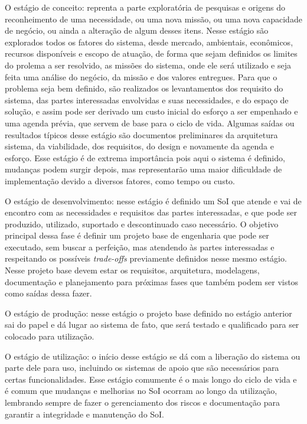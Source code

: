 	O estágio de conceito: reprenta a parte exploratória de pesquisas e origens do reconheimento de uma necessidade, ou uma nova missão, ou uma nova capacidade de negócio, ou
	ainda a alteração de algum desses itens. Nesse estágio são explorados todos os fatores do sistema, desde mercado, ambientais, econômicos, recursos disponíveis e escopo de
	atuação, de forma que sejam definidos os limites do prolema a ser resolvido, as missões do sistema, onde ele será utilizado e seja feita uma análise do negócio, da missão e
	dos valores entregues. Para que o problema seja bem definido, são realizados os levantamentos dos requisito do sistema, das partes interessadas envolvidas e suas necessidades,
	e do espaço de solução, e assim pode ser derivado um custo inicial do esforço a ser empenhado e uma agenda prévia, que servem de base para o ciclo de vida. Algumas saídas
	ou resultados típicos desse estágio são documentos preliminares da arquitetura sistema, da viabilidade, dos requisitos, do design e novamente da agenda e esforço. Esse
	estágio é de extrema importância pois aqui o sistema é definido, mudanças podem surgir depois, mas representarão uma maior dificuldade de implementação devido a diversos
	fatores, como tempo ou custo. 

	O estágio de desenvolvimento: nesse estágio é definido um SoI que atende e vai de encontro com as necessidades e requisitos das partes interessadas, e que pode ser
	produzido, utilizado, suportado e descontinuado caso necessário. O objetivo principal dessa fase é definir um projeto base de engenharia que pode ser executado, sem buscar a 
	perfeição, mas atendendo às partes interessadas e respeitando os possíveis \textit{trade-offs} previamente definidos nesse mesmo estágio. Nesse projeto base devem estar os
	requisitos, arquitetura, modelagens, documentação e planejamento para próximas fases que também podem ser vistos como saídas dessa fazer.

	O estágio de produção: nesse estágio o projeto base definido no estágio anterior sai do papel e dá lugar ao sistema de fato, que será testado e qualificado para ser
	colocado para utilização.

	O estágio de utilização: o início desse estágio se dá com a liberação do sistema ou parte dele para uso, incluindo os sistemas de apoio que são necessários para certas
	funcionalidades. Esse estágio comumente é o mais longo do ciclo de vida e é comum que mudanças e melhorias no SoI ocorram ao longo da utilização, lembrando sempre de fazer
	o gerenciamento dos riscos e documentação para garantir a integridade e manutenção do SoI.

